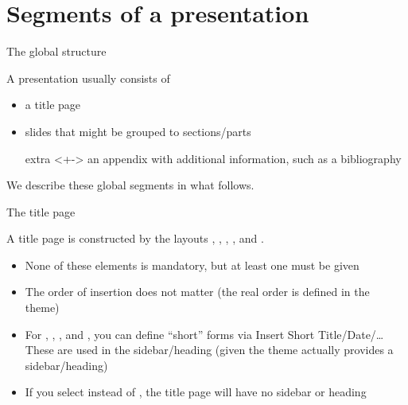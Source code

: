 \documentclass[english]{beamer}
\begin{document}
\section*{Segments of a presentation}

\begin{frame}{The global structure}

A presentation usually consists of
\begin{itemize}
\item<+-> a title page
\item<+-> slides that might be grouped to sections/parts
\item[extra]<+-> an appendix with additional information, such as a bibliography
\end{itemize}
We describe these global segments in what follows.
\end{frame}

\begin{frame}{The title page}

A title page is constructed by the layouts ,
, , ,
 and . 
\begin{itemize}
\item None of these elements is mandatory, but at least one must be given 
\item The order of insertion does not matter (the real order is defined
in the  theme)
\item For , , ,
 and , you can define ``short''
forms via \alert{Insert \textrightarrow Short Title\slash Date\slash\ldots}
These are used in the sidebar\slash heading (given the theme actually
provides a sidebar\slash heading)
\item If you select  instead of ,
the title page will have no sidebar or heading
\end{itemize}
\end{frame}
\end{document}
